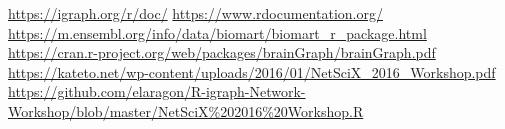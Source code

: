 \url{https://igraph.org/r/doc/}
\url{https://www.rdocumentation.org/}
\url{https://m.ensembl.org/info/data/biomart/biomart_r_package.html}
\url{https://cran.r-project.org/web/packages/brainGraph/brainGraph.pdf}
\url{https://kateto.net/wp-content/uploads/2016/01/NetSciX_2016_Workshop.pdf}
\url{https://github.com/elaragon/R-igraph-Network-Workshop/blob/master/NetSciX%202016%20Workshop.R}
